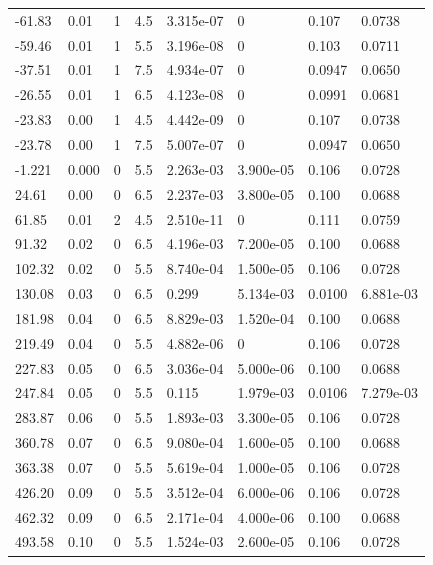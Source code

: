 \documentclass[preview]{standalone}
\begin{document}
{{\begin{tabular}{L{1.2cm}C{1.2cm} C{0.3cm}C{0.5cm} C{1.4cm}C{1.4cm} C{1.4cm}C{1.4cm}}
  -61.83  &  0.01  & 1     & 4.5 &  3.315e-07  & 0  & 0.107 &  0.0738   \\ 
  -59.46  &  0.01  & 1     & 5.5 &  3.196e-08  & 0  & 0.103 &  0.0711   \\ 
  -37.51  &  0.01  & 1     & 7.5 &  4.934e-07  & 0  & 0.0947 &  0.0650   \\ 
  -26.55  &  0.01  & 1     & 6.5 &  4.123e-08  & 0  & 0.0991 &  0.0681   \\ 
  -23.83  &  0.00  & 1     & 4.5 &  4.442e-09  & 0  & 0.107 &  0.0738   \\ 
  -23.78  &  0.00  & 1     & 7.5 &  5.007e-07  & 0  & 0.0947 &  0.0650   \\ 
  -1.221  &  0.000  & 0     & 5.5 &  2.263e-03  & 3.900e-05  & 0.106 &  0.0728   \\ 
  24.61  &  0.00  & 0     & 6.5 &  2.237e-03  & 3.800e-05  & 0.100 &  0.0688   \\ 
  61.85  &  0.01  & 2     & 4.5 &  2.510e-11  & 0  & 0.111 &  0.0759   \\ 
  91.32  &  0.02  & 0     & 6.5 &  4.196e-03  & 7.200e-05  & 0.100 &  0.0688   \\ 
  102.32  &  0.02  & 0     & 5.5 &  8.740e-04  & 1.500e-05  & 0.106 &  0.0728   \\ 
  130.08  &  0.03  & 0     & 6.5 &  0.299  & 5.134e-03  & 0.0100 &  6.881e-03   \\ 
  181.98  &  0.04  & 0     & 6.5 &  8.829e-03  & 1.520e-04  & 0.100 &  0.0688   \\ 
  219.49  &  0.04  & 0     & 5.5 &  4.882e-06  & 0  & 0.106 &  0.0728   \\ 
  227.83  &  0.05  & 0     & 6.5 &  3.036e-04  & 5.000e-06  & 0.100 &  0.0688   \\ 
  247.84  &  0.05  & 0     & 5.5 &  0.115  & 1.979e-03  & 0.0106 &  7.279e-03   \\ 
  283.87  &  0.06  & 0     & 5.5 &  1.893e-03  & 3.300e-05  & 0.106 &  0.0728   \\ 
  360.78  &  0.07  & 0     & 6.5 &  9.080e-04  & 1.600e-05  & 0.100 &  0.0688   \\ 
  363.38  &  0.07  & 0     & 5.5 &  5.619e-04  & 1.000e-05  & 0.106 &  0.0728   \\ 
  426.20  &  0.09  & 0     & 5.5 &  3.512e-04  & 6.000e-06  & 0.106 &  0.0728   \\ 
  462.32  &  0.09  & 0     & 6.5 &  2.171e-04  & 4.000e-06  & 0.100 &  0.0688   \\ 
  493.58  &  0.10  & 0     & 5.5 &  1.524e-03  & 2.600e-05  & 0.106 &  0.0728   \\ 

\end{tabular}}}
\end{document}
